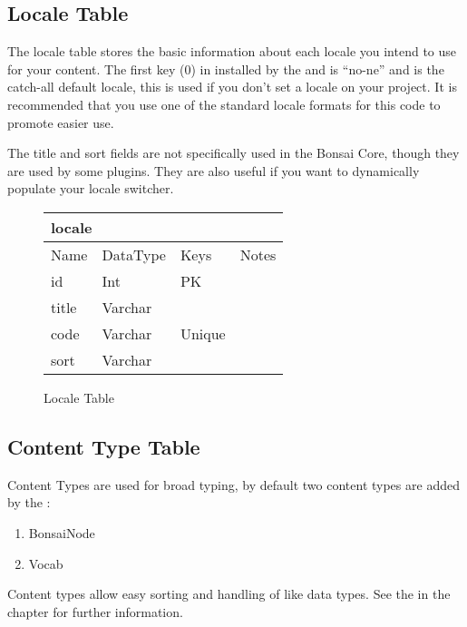 \documentclass[]{book}
\begin{document}
\subsection{Locale Table}

The locale table stores the basic information about each locale you intend to use for your content. The first key (0) in installed by the  and is \enquote{no-ne} and is the catch-all default locale, this is used if you don't set a locale on your project. It is recommended that you use one of the standard locale formats for this code to promote easier use.

The title and sort fields are not specifically used in the Bonsai Core, though they are used by some plugins. They are also useful if you want to dynamically populate your locale switcher.

\begin{figure}[H]
	\centering
	\caption{Locale Table}
	\vspace{12pt}
	\begin{tabular}{ |p{1.25in}|p{.75in}|p{2in}|p{1in}| }
		\hline
		\multicolumn{4}{|l|}{\textbf{locale}} \\
		\hline
		\hline
		Name & DataType & Keys & Notes\\
		\hline
		id & Int & PK & \\
		title & Varchar & & \\
		code & Varchar & Unique & \\
		sort & Varchar & & \\
		\hline
	\end{tabular}
\end{figure}

\subsection{Content Type Table}

Content Types are used for broad typing, by default two content types are added by the :

\begin{enumerate}
	\item BonsaiNode
	\item Vocab
\end{enumerate}

Content types allow easy sorting and handling of like data types. See the  in the  chapter for further information.
\end{document}
